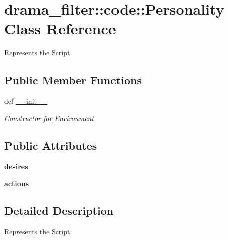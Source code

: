 \hypertarget{classdrama__filter_1_1code_1_1Personality}{
\section{drama\_\-filter::code::Personality Class Reference}
\label{classdrama__filter_1_1code_1_1Personality}
}


Represents the \hyperlink{classdrama__filter_1_1code_1_1Script}{Script}.  


\subsection*{Public Member Functions}
\begin{DoxyCompactItemize}
\item 
def \hyperlink{classdrama__filter_1_1code_1_1Personality_aa9f3540ba3f0a72221d76e460d60a712}{\_\-\_\-init\_\-\_\-}
\begin{DoxyCompactList}\small\item\em Constructor for \hyperlink{classdrama__filter_1_1code_1_1Environment}{Environment}. \end{DoxyCompactList}\end{DoxyCompactItemize}
\subsection*{Public Attributes}
\begin{DoxyCompactItemize}
\item 
\hypertarget{classdrama__filter_1_1code_1_1Personality_a8b1323496623a1c1e39862af5721fd95}{
{\bfseries desires}}
\label{classdrama__filter_1_1code_1_1Personality_a8b1323496623a1c1e39862af5721fd95}

\item 
\hypertarget{classdrama__filter_1_1code_1_1Personality_afc729cc3f8066f60328e62c907f28d72}{
{\bfseries actions}}
\label{classdrama__filter_1_1code_1_1Personality_afc729cc3f8066f60328e62c907f28d72}

\end{DoxyCompactItemize}


\subsection{Detailed Description}
Represents the \hyperlink{classdrama__filter_1_1code_1_1Script}{Script}. 

